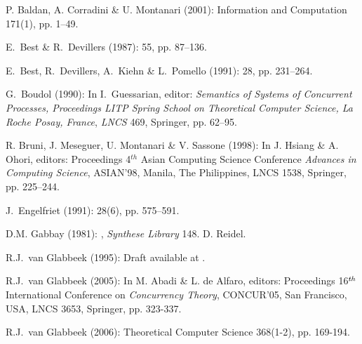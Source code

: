 \documentclass[twocolumn]{article}
\begin{document}
\begin{thebibliography}{10}
\small

{\sc P. Baldan, A. Corradini \& U. Montanari} (2001):
\newblock Information and Computation 171(1), pp. 1--49.

{\sc E.~Best \& R.~Devillers} (1987):
 55, pp. 87--136.

{\sc E.~Best, R.~Devillers, A.~Kiehn \& L.~Pomello} (1991):
 28, pp. 231--264.

{\sc G.~Boudol} (1990):
\newblock In I.~Guessarian, editor: {\sl Semantics of Systems of Concurrent Processes, Proceedings LITP Spring School on Theoretical Computer Science, {\rm La Roche Posay, France}}, {\sl \rm LNCS} 469, Springer, pp. 62--95.

{\sc R. Bruni, J. Meseguer, U. Montanari \& V. Sassone} (1998):
\newblock In J. Hsiang \& A. Ohori, editors: Proceedings
4$^{th}$ Asian Computing Science Conference {\sl Advances in
Computing Science}, ASIAN'98, Manila,  The Philippines,
LNCS 1538, Springer, pp. 225--244.

{\sc J.~Engelfriet} (1991):
 28(6), pp. 575--591.

{\sc D.M. Gabbay} (1981):
, {\sl Synthese Library} 148.
\newblock D. Reidel.

{\sc R.J.~van Glabbeek} (1995):
\newblock Draft available at
.

{\sc R.J.~van Glabbeek} (2005):
\newblock In M. Abadi \& L. de Alfaro, editors: Proceedings 16$^{\it
th}$ International Conference on {\sl Concurrency Theory}, CONCUR'05, San Francisco, USA, LNCS 3653, Springer, pp. 323-337.

{\sc R.J.~van Glabbeek} (2006):
\newblock Theoretical Computer Science 368(1-2), pp. 169-194.


\end{thebibliography}
\end{document}
